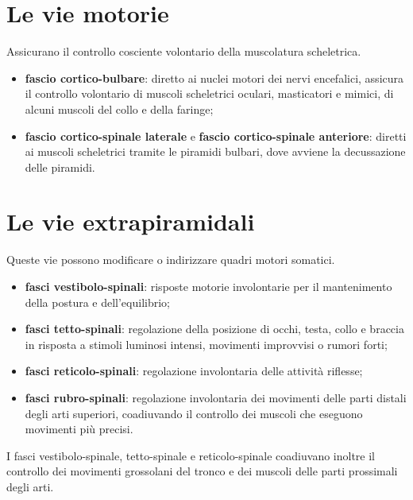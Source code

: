 \section{Le vie motorie}

Assicurano il controllo cosciente volontario della muscolatura
scheletrica.
\begin{itemize}
  \item \textbf{fascio cortico-bulbare}: diretto ai nuclei motori dei
    nervi encefalici, assicura il controllo volontario di muscoli
    scheletrici oculari, masticatori e mimici, di alcuni muscoli del
    collo e della faringe;
  \item \textbf{fascio cortico-spinale laterale} e \textbf{fascio
    cortico-spinale anteriore}: diretti ai muscoli scheletrici tramite le
    piramidi bulbari, dove avviene la decussazione delle piramidi.
\end{itemize}

\section{Le vie extrapiramidali}

Queste vie possono modificare o indirizzare quadri motori somatici.

\begin{itemize}
  \item \textbf{fasci vestibolo-spinali}: risposte motorie involontarie
    per il mantenimento della postura e dell'equilibrio;
  \item \textbf{fasci tetto-spinali}: regolazione della posizione di
    occhi, testa, collo e braccia in risposta a stimoli luminosi intensi,
    movimenti improvvisi o rumori forti;
  \item \textbf{fasci reticolo-spinali}: regolazione involontaria delle
    attività riflesse;
  \item \textbf{fasci rubro-spinali}: regolazione involontaria dei
    movimenti delle parti distali degli arti superiori, coadiuvando il
    controllo dei muscoli che eseguono movimenti più precisi.
\end{itemize}

I fasci vestibolo-spinale, tetto-spinale e reticolo-spinale coadiuvano
inoltre il controllo dei movimenti grossolani del tronco e dei muscoli
delle parti prossimali degli arti.

